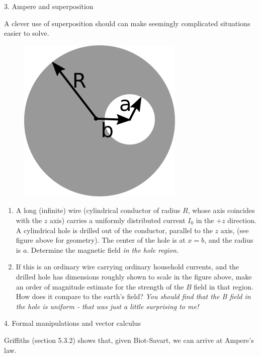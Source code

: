 \documentclass[11pt]{article}
\def\tightlist{}
\begin{document}
{\Large 3. Ampere and superposition}\label{ampere-and-superposition}

A clever use of superposition should can make seemingly complicated
situations easier to solve.

\begin{figure}[htbp]
\centering
\includegraphics[width=0.4\linewidth]{./images/hw10/wire_w_hole.png}
\end{figure}

\begin{enumerate}
\def\labelenumi{\arabic{enumi}.}
\tightlist
\item
  A long (infinite) wire (cylindrical conductor of radius \(R\), whose
  axis coincides with the \(z\) axis) carries a uniformly distributed
  current \(I_0\) in the \(+z\) direction. A cylindrical hole is drilled
  out of the conductor, parallel to the \(z\) axis, (see figure above
  for geometry). The center of the hole is at \(x = b\), and the radius
  is \(a\). Determine the magnetic field \emph{in the hole region.}
\item
  If this is an ordinary wire carrying ordinary household currents, and
  the drilled hole has dimensions roughly shown to scale in the figure
  above, make an order of magnitude estimate for the strength of the
  \(B\) field in that region. How does it compare to the earth's field?
  \emph{You should find that the B field in the hole is uniform - that
  was just a little surprising to me!}
\end{enumerate}

{\Large 4. Formal manipulations and vector
calculus}\label{formal-manipulations-and-vector-calculus}

Griffiths (section 5.3.2) shows that, given Biot-Savart, we can arrive
at Ampere's law.
\end{document}
